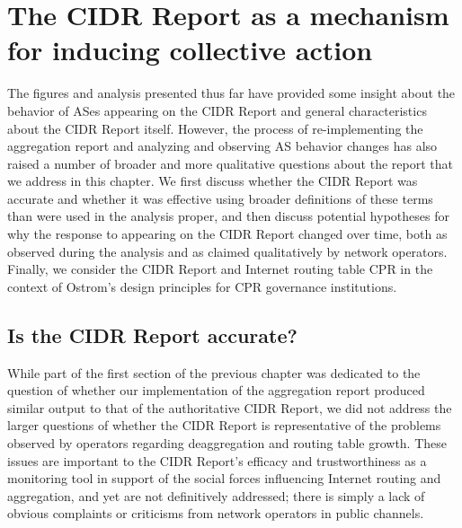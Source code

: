 \chapter{The CIDR Report as a mechanism for inducing collective action}
\label{chap:discussion}

%

The figures and analysis presented thus far have provided some insight about
the behavior of ASes appearing on the CIDR Report and general characteristics
about the CIDR Report itself. However, the process of re-implementing the
aggregation report and analyzing and observing AS behavior changes has also
raised a number of broader and more qualitative questions about the report
that we address in this chapter. We first discuss whether the CIDR Report was
accurate and whether it was effective using broader definitions of these terms
than were used in the analysis proper, and then discuss potential hypotheses
for why the response to appearing on the CIDR Report changed over time, both as
observed during the analysis and as claimed qualitatively by network operators.
Finally, we consider the CIDR Report and Internet routing table CPR in the
context of Ostrom's design principles for CPR governance institutions.

\section{Is the CIDR Report accurate?}
While part of the first section of the previous chapter was dedicated to the
question of whether our implementation of the aggregation report produced
similar output to that of the authoritative CIDR Report, we did not address the
larger questions of whether the CIDR Report is representative of the problems
observed by operators regarding deaggregation and routing table growth. These
issues are important to the CIDR Report's efficacy and trustworthiness as a
monitoring tool in support of the social forces influencing Internet routing
and aggregation, and yet are not definitively addressed; there is simply a lack
of obvious complaints or criticisms from network operators in public channels.

